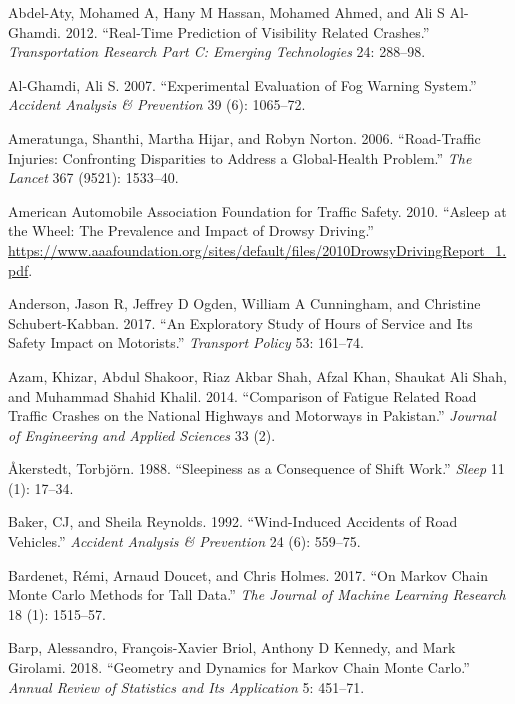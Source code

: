 \documentclass[12pt]{book}
\numberwithin{equation}{chapter}
\begin{document}
\hypertarget{refs}{}
\leavevmode\hypertarget{ref-abdel2012real}{}%
Abdel-Aty, Mohamed A, Hany M Hassan, Mohamed Ahmed, and Ali S Al-Ghamdi. 2012. ``Real-Time Prediction of Visibility Related Crashes.'' \emph{Transportation Research Part C: Emerging Technologies} 24: 288--98.

\leavevmode\hypertarget{ref-al2007experimental}{}%
Al-Ghamdi, Ali S. 2007. ``Experimental Evaluation of Fog Warning System.'' \emph{Accident Analysis \& Prevention} 39 (6): 1065--72.

\leavevmode\hypertarget{ref-ameratunga2006road}{}%
Ameratunga, Shanthi, Martha Hijar, and Robyn Norton. 2006. ``Road-Traffic Injuries: Confronting Disparities to Address a Global-Health Problem.'' \emph{The Lancet} 367 (9521): 1533--40.

\leavevmode\hypertarget{ref-aaafoundation}{}%
American Automobile Association Foundation for Traffic Safety. 2010. ``Asleep at the Wheel: The Prevalence and Impact of Drowsy Driving.'' \url{https://www.aaafoundation.org/sites/default/files/2010DrowsyDrivingReport_1.pdf}.

\leavevmode\hypertarget{ref-anderson2017exploratory}{}%
Anderson, Jason R, Jeffrey D Ogden, William A Cunningham, and Christine Schubert-Kabban. 2017. ``An Exploratory Study of Hours of Service and Its Safety Impact on Motorists.'' \emph{Transport Policy} 53: 161--74.

\leavevmode\hypertarget{ref-azam2014comparison}{}%
Azam, Khizar, Abdul Shakoor, Riaz Akbar Shah, Afzal Khan, Shaukat Ali Shah, and Muhammad Shahid Khalil. 2014. ``Comparison of Fatigue Related Road Traffic Crashes on the National Highways and Motorways in Pakistan.'' \emph{Journal of Engineering and Applied Sciences} 33 (2).

\leavevmode\hypertarget{ref-aakerstedt1988sleepiness}{}%
Åkerstedt, Torbjörn. 1988. ``Sleepiness as a Consequence of Shift Work.'' \emph{Sleep} 11 (1): 17--34.

\leavevmode\hypertarget{ref-baker1992wind}{}%
Baker, CJ, and Sheila Reynolds. 1992. ``Wind-Induced Accidents of Road Vehicles.'' \emph{Accident Analysis \& Prevention} 24 (6): 559--75.

\leavevmode\hypertarget{ref-bardenet2017markov}{}%
Bardenet, Rémi, Arnaud Doucet, and Chris Holmes. 2017. ``On Markov Chain Monte Carlo Methods for Tall Data.'' \emph{The Journal of Machine Learning Research} 18 (1): 1515--57.

\leavevmode\hypertarget{ref-barp2018geometry}{}%
Barp, Alessandro, François-Xavier Briol, Anthony D Kennedy, and Mark Girolami. 2018. ``Geometry and Dynamics for Markov Chain Monte Carlo.'' \emph{Annual Review of Statistics and Its Application} 5: 451--71.
\end{document}
